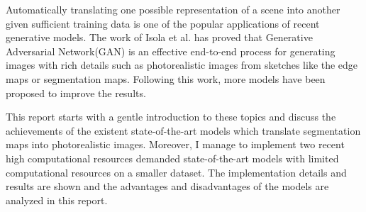 Automatically translating one possible representation of a scene into another given sufficient training data 
is one of the popular applications of recent generative models. 
The work of Isola et al.\cite{pix2pix2016} has proved that 
Generative Adversarial Network(GAN) is an effective end-to-end process for generating images 
with rich details such as photorealistic images from sketches like the edge maps or segmentation maps. 
Following this work, more models have been proposed to improve the results. 

This report starts with a gentle introduction to these topics and discuss 
the achievements of the existent state-of-the-art models 
which translate segmentation maps into photorealistic images. 
Moreover, I manage to implement two recent high computational resources demanded 
state-of-the-art models with limited computational resources on a smaller dataset. 
The implementation details and results are shown and 
the advantages and disadvantages of the models are analyzed in this report.



